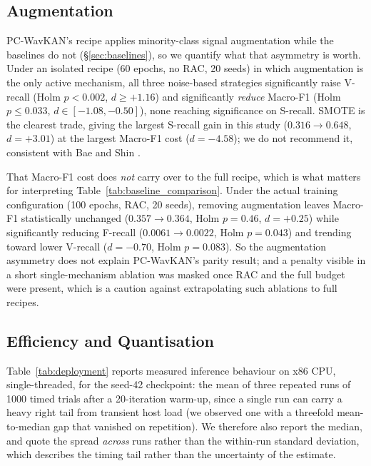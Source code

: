 \documentclass[journal,twoside,web]{ieeecolor}
\begin{document}
\subsection{Augmentation}
\label{sec:results_augmentation}
PC-WavKAN's recipe applies minority-class signal augmentation while the baselines do not (\S\ref{sec:baselines}), so we quantify what that asymmetry is worth. Under an isolated recipe (60 epochs, no RAC, 20 seeds) in which augmentation is the only active mechanism, all three noise-based strategies significantly raise V-recall (Holm $p<0.002$, $d\geq+1.16$) and significantly \emph{reduce} Macro-F1 (Holm $p\leq0.033$, $d\in[-1.08,-0.50]$), none reaching significance on S-recall. SMOTE is the clearest trade, giving the largest S-recall gain in this study ($0.316\rightarrow0.648$, $d=+3.01$) at the largest Macro-F1 cost ($d=-4.58$); we do not recommend it, consistent with Bae and Shin \cite{bae_handling_2025}.

That Macro-F1 cost does \emph{not} carry over to the full recipe, which is what matters for interpreting Table~\ref{tab:baseline_comparison}. Under the actual training configuration (100 epochs, RAC, 20 seeds), removing augmentation leaves Macro-F1 statistically unchanged ($0.357\rightarrow0.364$, Holm $p=0.46$, $d=+0.25$) while significantly reducing F-recall ($0.0061\rightarrow0.0022$, Holm $p=0.043$) and trending toward lower V-recall ($d=-0.70$, Holm $p=0.083$). So the augmentation asymmetry does not explain PC-WavKAN's parity result; and a penalty visible in a short single-mechanism ablation was masked once RAC and the full budget were present, which is a caution against extrapolating such ablations to full recipes.


\subsection{Efficiency and Quantisation}
\label{sec:results_deploy}
Table~\ref{tab:deployment} reports measured inference behaviour on x86 CPU, single-threaded, for the seed-42 checkpoint: the mean of three repeated runs of 1000 timed trials after a 20-iteration warm-up, since a single run can carry a heavy right tail from transient host load (we observed one with a threefold mean-to-median gap that vanished on repetition). We therefore also report the median, and quote the spread \emph{across} runs rather than the within-run standard deviation, which describes the timing tail rather than the uncertainty of the estimate.
\end{document}
